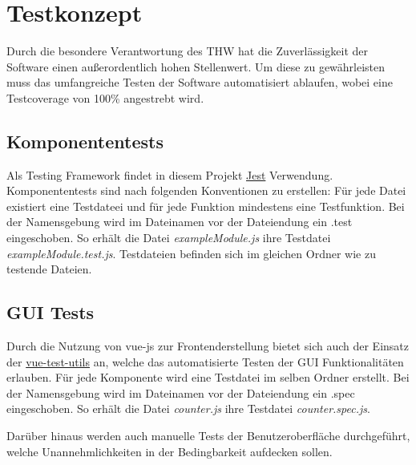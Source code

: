 \section{Testkonzept}
Durch die besondere Verantwortung des THW hat die Zuverlässigkeit der Software einen außerordentlich hohen Stellenwert. Um diese zu gewährleisten muss das umfangreiche Testen der Software automatisiert ablaufen, wobei eine Testcoverage von 100\% angestrebt wird.
\subsection{Komponententests}
Als Testing Framework findet in diesem Projekt \href{https://facebook.github.io/jest/docs/en/getting-started.htmll}{Jest} Verwendung. Komponententests sind nach folgenden Konventionen zu erstellen: Für jede Datei existiert eine Testdateei und für jede Funktion mindestens eine Testfunktion. Bei der Namensgebung wird im Dateinamen vor der Dateiendung ein .test eingeschoben. So erhält die Datei \textit{exampleModule.js} ihre Testdatei \textit{exampleModule.test.js}. Testdateien befinden sich im gleichen Ordner wie zu testende Dateien.
\subsection{GUI Tests}
Durch die Nutzung von vue-js zur Frontenderstellung bietet sich auch der Einsatz der \href{https://vue-test-utils.vuejs.org/en/}{vue-test-utils} an, welche das automatisierte Testen der GUI Funktionalitäten erlauben. Für jede Komponente wird eine Testdatei im selben Ordner erstellt. Bei der Namensgebung wird im Dateinamen vor der Dateiendung ein .spec eingeschoben. So erhält die Datei \textit{counter.js} ihre Testdatei \textit{counter.spec.js}.

Darüber hinaus werden auch manuelle Tests der Benutzeroberfläche durchgeführt, welche Unannehmlichkeiten in der Bedingbarkeit aufdecken sollen.